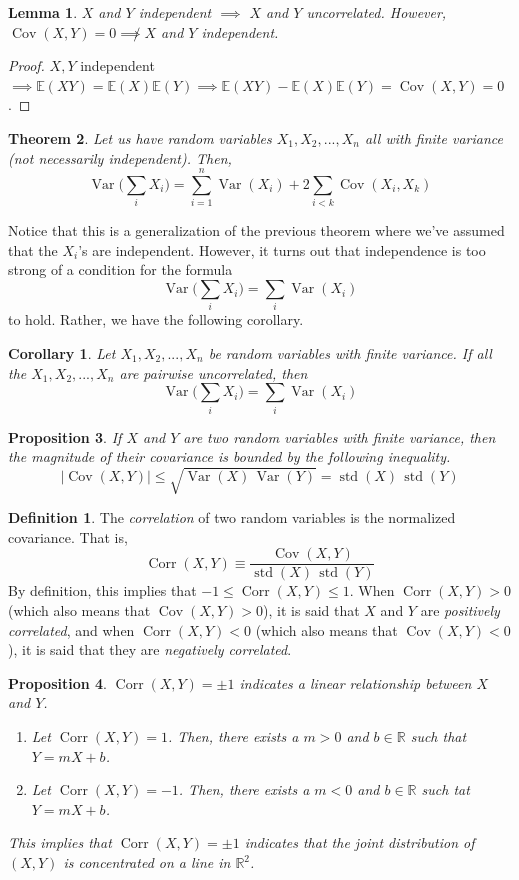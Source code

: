 \documentclass{article}
\DeclareMathOperator{\std}{std}
\DeclareMathOperator{\Cov}{Cov}
\DeclareMathOperator{\Var}{Var}
\DeclareMathOperator{\Corr}{Corr}
\newtheorem{theorem}{Theorem}[section]
\newtheorem{proposition}[theorem]{Proposition}
\newtheorem{lemma}[theorem]{Lemma}
\newtheorem{corollary}{Corollary}[theorem]
\theoremstyle{remark}
\theoremstyle{definition}
\newtheorem{definition}{Definition}[section]
\begin{document}
\begin{lemma}
$X$ and $Y$ independent $\implies$ $X$ and $Y$ uncorrelated. However, $\Cov(X, Y) = 0 \not\implies X$ and $Y$ independent. 
\end{lemma}
\begin{proof}
$X, Y$ independent $\implies \mathbb{E}(XY) = \mathbb{E}(X) \mathbb{E}(Y) \implies \mathbb{E}(XY) - \mathbb{E}(X) \mathbb{E}(Y) = \Cov(X, Y) = 0$. 
\end{proof}

\begin{theorem}
Let us have random variables $X_1, X_2, ..., X_n$ all with finite variance (not necessarily independent). Then, 
\[\Var \Big( \sum_i X_i \Big) = \sum_{i=1}^n \Var(X_i) + 2 \sum_{i < k} \Cov(X_i, X_k)\]
\end{theorem}

Notice that this is a generalization of the previous theorem where we've assumed that the $X_i$'s are independent. However, it turns out that independence is too strong of a condition for the formula
\[\Var \Big( \sum_i X_i \Big) = \sum_i \Var(X_i)\]
to hold. Rather, we have the following corollary. 

\begin{corollary}
Let $X_1, X_2, ..., X_n$ be random variables with finite variance. If all the $X_1, X_2,..., X_n$ are pairwise uncorrelated, then 
\[\Var \Big( \sum_i X_i \Big) = \sum_i \Var(X_i)\]
\end{corollary}

\begin{proposition}
If $X$ and $Y$ are two random variables with finite variance, then the magnitude of their covariance is bounded by the following inequality. 
\[|\Cov(X,Y)| \leq \sqrt{\Var(X) \, \Var(Y)} = \std(X) \, \std(Y)\]
\end{proposition}

\begin{definition}
The \textit{correlation} of two random variables is the normalized covariance. That is, 
\[\Corr(X, Y) \equiv \frac{\Cov(X, Y)}{\std(X) \, \std(Y)}\]
By definition, this implies that $-1 \leq \Corr(X, Y) \leq 1$. When $\Corr(X, Y) > 0$ (which also means that $\Cov(X, Y) > 0$), it is said that $X$ and $Y$ are \textit{positively correlated}, and when $\Corr(X, Y) < 0$ (which also means that $\Cov(X, Y) < 0$), it is said that they are \textit{negatively correlated}. 
\end{definition}

\begin{proposition}
$\Corr(X,Y) = \pm 1$ indicates a linear relationship between $X$ and $Y$. 
\begin{enumerate}
    \item Let $\Corr(X, Y) = 1$. Then, there exists a $m>0$ and $b \in \mathbb{R}$ such that $Y = m X + b$. 
    \item Let $\Corr(X, Y) = -1$. Then, there exists a $m<0$ and $b \in \mathbb{R}$ such tat $Y = m X + b$. 
\end{enumerate}
This implies that $\Corr(X, Y) = \pm 1$ indicates that the joint distribution of $(X, Y)$ is concentrated on a line in $\mathbb{R}^2$. 
\end{proposition}
\end{document}
